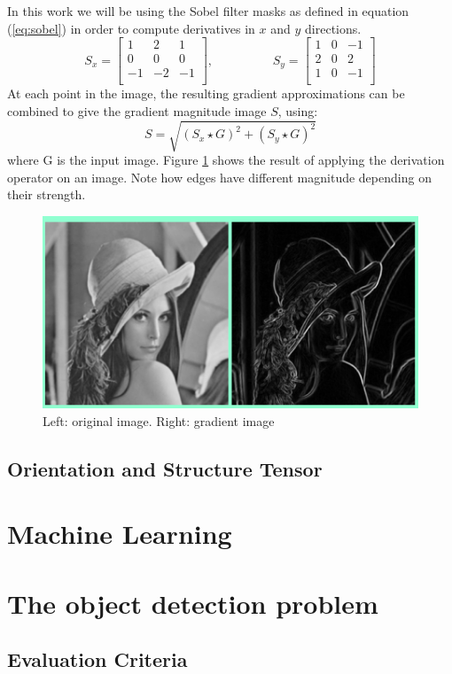 		In this work we will be using the Sobel filter masks as defined in equation (\ref{eq:sobel}) in order to compute derivatives in $x$ and $y$ directions. 
		\begin{equation}
			S_x =
			 \begin{bmatrix}
     				1	& 2 & 1 \\
    					0	 & 0 & 0 \\
    					-1	 & -2 & -1 \\
				\end{bmatrix},
			\hspace{2cm}
			S_y = 
				\begin{bmatrix}
     				1	& 0 & -1 \\
    					2	 & 0 & 2 \\
    					1	 & 0 & -1 \\
				\end{bmatrix}
			\label{eq:sobel}
			\end{equation}
		At each point in the image, the resulting gradient approximations can be combined to give the gradient magnitude image $S$, using:
		\begin{equation}
			S = \sqrt{(S_x \star G )^2 + (S_y \star G)^2}
			\label{eq:grad_sobel}
		\end{equation}
		where G is the input image. Figure \ref{fig:sobel_demo} shows the result of applying the derivation operator on an image. Note how edges have different magnitude depending on their strength. 

		\begin{figure}
			\centering
			\includegraphics[scale=0.5]{images/lena_orig_sobel.png}
			\caption{Left: original image. Right: gradient image}
			\label{fig:sobel_demo}
		\end{figure}
		
		
		\subsection{Orientation and Structure Tensor}
		
		
	
	\section{Machine Learning}
	\label{machine_learning}
	
	\section{The object detection problem}
	\label{the_object_detection_problem}
		\subsection{Evaluation Criteria}

